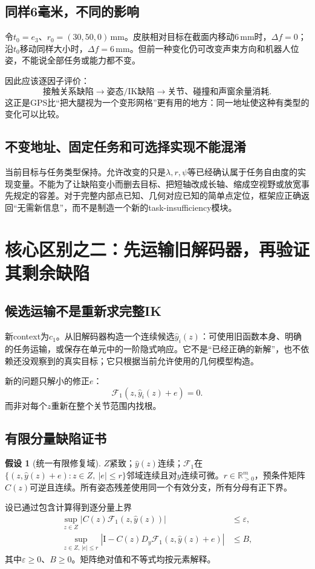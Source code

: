 \documentclass[UTF8,11pt,a4paper,fontset=fandol]{ctexart}
\numberwithin{equation}{section}
\theoremstyle{definition}
\newtheorem{assumption}[theorem]{假设}
\newcommand{\R}{\mathbb R}
\newcommand{\Id}{\mathrm I}
\begin{document}
\subsection{同样6毫米，不同的影响}
令$t_0=e_3$、$r_0=(30,50,0)\,\mathrm{mm}$。皮肤相对目标在截面内移动$6\,\mathrm{mm}$时，$\Delta f=0$；沿$t_0$移动同样大小时，$\Delta f=6\,\mathrm{mm}$。但前一种变化仍可改变声束方向和机器人位姿，不能说全部任务或能力都不变。

因此应该逐因子评价：
\begin{equation}
\text{接触关系缺陷}\rightarrow
\text{姿态/IK缺陷}\rightarrow
\text{关节、碰撞和声窗余量消耗}.
\end{equation}
这正是GPS比“把大腿视为一个变形网格”更有用的地方：同一地址使这种有类型的变化可以比较。

\subsection{不变地址、固定任务和可选择实现不能混淆}
当前目标与任务类型保持。允许改变的只是$\lambda,r,\psi$等已经确认属于任务自由度的实现变量。不能为了让缺陷变小而删去目标、把短轴改成长轴、缩成空视野或放宽事先规定的容差。对于完整内部点已知、几何对应已知的简单点定位，框架应正确返回“无需新信息”，而不是制造一个新的task-insufficiency模块。

\section{核心区别之二：先运输旧解码器，再验证其剩余缺陷}
\subsection{候选运输不是重新求完整IK}
新context为$c_1$。从旧解码器构造一个连续候选$\widehat y_i(z)$：可使用旧函数本身、明确的任务运输，或保存在单元中的一阶隐式响应。它不是“已经正确的新解”，也不依赖还没观察到的真实目标；它只根据当前允许使用的几何模型构造。

新的问题只解小的修正$e$：
\begin{equation}
 \mathcal F_1(z,\widehat y_i(z)+e)=0.
 \label{eq:repair}
\end{equation}
而非对每个$z$重新在整个关节范围内找根。

\subsection{有限分量缺陷证书}
\begin{assumption}[统一有限修复域]
$Z$紧致；$\widehat y(z)$连续；$\mathcal F_1$在$\{(z,\widehat y(z)+e):z\in Z,\ |e|\le r\}$邻域连续且对$y$连续可微。$r\in\R_{>0}^m$，预条件矩阵$C(z)$可逆且连续。所有姿态残差使用同一个有效分支，所有分母有正下界。
\end{assumption}
设已通过包含计算得到逐分量上界
\begin{align}
 \sup_{z\in Z}|C(z)\mathcal F_1(z,\widehat y(z))|&\le\varepsilon,\\
 \sup_{z\in Z,\,|e|\le r}|\Id-C(z)D_y\mathcal F_1(z,\widehat y(z)+e)|&\le B,
 \label{eq:componentbounds}
\end{align}
其中$\varepsilon\ge0$、$B\ge0$。矩阵绝对值和不等式均按元素解释。
\end{document}
